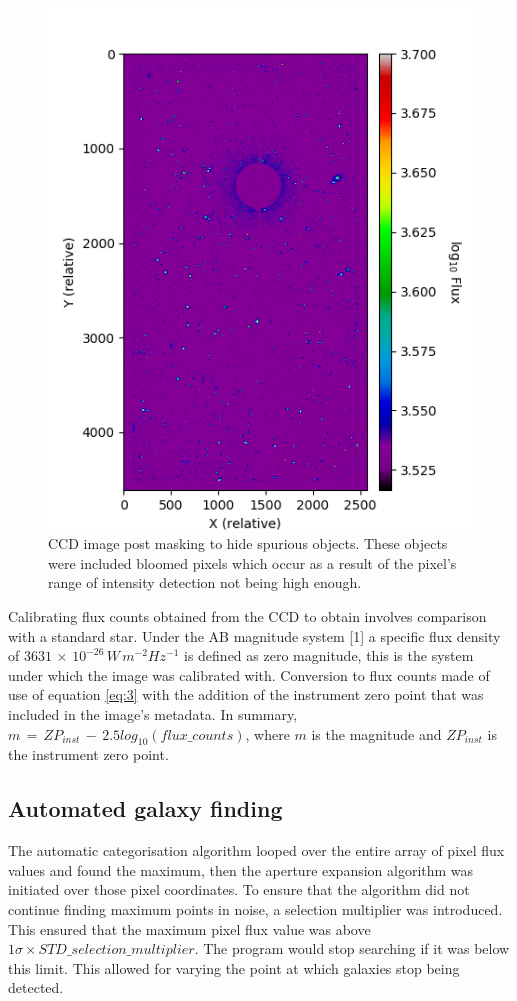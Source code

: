\documentclass[journal]{IEEEtran}
\begin{document}
\begin{figure}[H]
    \centering
    \includegraphics[scale=0.4]{Figure_6.png}
    \caption{CCD image post masking to hide spurious objects. These objects were included bloomed pixels which occur as a result of the pixel's range of intensity detection not being high enough.}
    \label{fig:4}
\end{figure}

\noindent Calibrating flux counts obtained from the CCD to obtain involves comparison with a standard star. Under the AB magnitude system [1] a specific flux density of $3631\,\times\,10^{-26}\,W\,m^{-2}Hz^{-1}$ is defined as zero magnitude, this is the system under which the image was calibrated with. Conversion to flux counts made of use of equation \ref{eq:3} with the addition of the instrument zero point that was included in the image's metadata. In summary, $m\,=\,ZP_{inst}\,-\,2.5log_{10}(flux\_counts)$, where $m$ is the magnitude and $ZP_{inst}$ is the instrument zero point.

\subsection{Automated galaxy finding}
The automatic categorisation algorithm looped over the entire array of pixel flux values and found the maximum, then the aperture expansion algorithm was initiated over those pixel coordinates. To ensure that the algorithm did not continue finding maximum points in noise, a selection multiplier was introduced. This ensured that the maximum pixel flux value was above $1\sigma\times STD\_selection\_multiplier$. The program would stop searching if it was below this limit. This allowed for varying the point at which galaxies stop being detected.\newline
\end{document}

